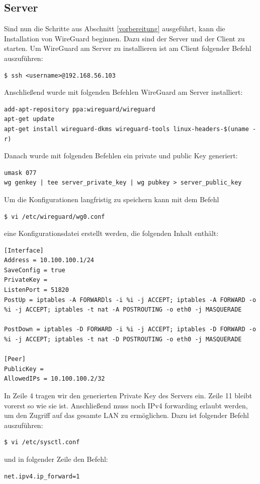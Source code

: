 \subsection{Server}
Sind nun die Schritte aus Abschnitt \ref{vorbereitung} ausgeführt, kann die Installation von WireGuard beginnen. Dazu sind der Server und der Client zu starten. Um WireGuard am Server zu installieren ist am Client folgender Befehl auszuführen:
\begin{lstlisting}
$ ssh <username>@192.168.56.103
\end{lstlisting}
Anschließend wurde mit folgenden Befehlen WireGuard am Server installiert:
\begin{lstlisting}
add-apt-repository ppa:wireguard/wireguard
apt-get update
apt-get install wireguard-dkms wireguard-tools linux-headers-$(uname -r)
\end{lstlisting}
Danach wurde mit folgenden Befehlen ein private und public Key generiert:
\begin{lstlisting}
umask 077
wg genkey | tee server_private_key | wg pubkey > server_public_key
\end{lstlisting}
\newpage \noindent
Um die Konfigurationen langfristig zu speichern kann mit dem Befehl
\begin{lstlisting}
$ vi /etc/wireguard/wg0.conf
\end{lstlisting}
eine Konfigurationsdatei erstellt werden, die folgenden Inhalt enthält:
\begin{lstlisting}
[Interface]
Address = 10.100.100.1/24
SaveConfig = true
PrivateKey = 
ListenPort = 51820
PostUp = iptables -A FORWARDls -i %i -j ACCEPT; iptables -A FORWARD -o %i -j ACCEPT; iptables -t nat -A POSTROUTING -o eth0 -j MASQUERADE

PostDown = iptables -D FORWARD -i %i -j ACCEPT; iptables -D FORWARD -o %i -j ACCEPT; iptables -t nat -D POSTROUTING -o eth0 -j MASQUERADE

[Peer]
PublicKey = 
AllowedIPs = 10.100.100.2/32
\end{lstlisting}
In Zeile 4 tragen wir den generierten Private Key des Servers ein. Zeile 11 bleibt vorerst so wie sie ist. \newline\newline
Anschließend muss noch IPv4 forwarding erlaubt werden, um den Zugriff auf das gesamte LAN zu ermöglichen.
Dazu ist folgender Befehl auszuführen:
\begin{lstlisting}
$ vi /etc/sysctl.conf
\end{lstlisting}
und in folgender Zeile den Befehl:
\begin{lstlisting}
net.ipv4.ip_forward=1
\end{lstlisting}
